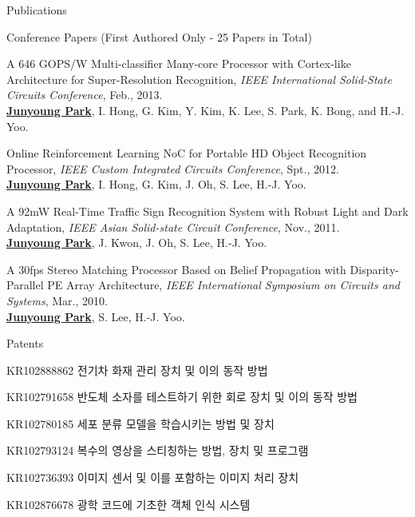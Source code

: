 \documentclass{resume} %
\newcommand{\ko}[1]{{\upshape\koreanfont #1}}
\begin{document}
\begin{section}{Publications}
\begin{subsection}{Conference Papers (First Authored Only - 25 Papers in Total)}{}{}{}
\item A 646 GOPS/W Multi-classifier Many-core Processor with Cortex-like Architecture for Super-Resolution Recognition, \emph{IEEE International Solid-State Circuits Conference}, Feb., 2013. \\
{\small \underline{\bf Junyoung Park}, I. Hong, G. Kim, Y. Kim, K. Lee, S. Park, K. Bong, and H.-J. Yoo.}

\item Online Reinforcement Learning NoC for Portable HD Object Recognition Processor, \emph{IEEE Custom Integrated Circuits Conference}, Spt., 2012. \\
{\small \underline{\bf Junyoung Park}, I. Hong, G. Kim, J. Oh, S. Lee, H.-J. Yoo.}

\item A 92mW Real-Time Traffic Sign Recognition System with Robust Light and Dark Adaptation, \emph{IEEE Asian Solid-state Circuit Conference}, Nov., 2011. \\
{\small \underline{\bf Junyoung Park}, J. Kwon, J. Oh, S. Lee, H.-J. Yoo.}

\item A 30fps Stereo Matching Processor Based on Belief Propagation with Disparity-Parallel PE Array Architecture, \emph{IEEE International Symposium on Circuits and Systems}, Mar., 2010. \\
{\small \underline{\bf Junyoung Park}, S. Lee, H.-J. Yoo.}

\end{subsection}

\begin{subsection}{Patents}{}{}{}

\item {\small KR102888862 \ko{전기차 화재 관리 장치 및 이의 동작 방법}} 

\item {\small KR102791658 \ko{반도체 소자를 테스트하기 위한 회로 장치 및 이의 동작 방법}} 

\item {\small KR102780185 \ko{세포 분류 모델을 학습시키는 방법 및 장치}} 

\item {\small KR102793124 \ko{복수의 영상을 스티칭하는 방법, 장치 및 프로그램}} 

\item {\small KR102736393 \ko{이미지 센서 및 이를 포함하는 이미지 처리 장치}} 

\item {\small KR102876678 \ko{광학 코드에 기초한 객체 인식 시스템}} 


\end{subsection}
\end{section}
\end{document}
